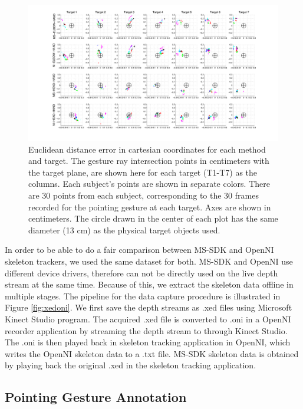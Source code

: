 \documentclass[12pt]{gatech-thesis}
\begin{document}
\begin{figure}[ht!]
\centering
\includegraphics[width=1.0\textwidth]{pics/projections.pdf}
\caption{Euclidean distance error in cartesian coordinates for each method and target. The gesture ray intersection points in centimeters with the target plane, are shown here for each target (T1-T7) as the columns.  Each subject's points are shown in separate colors.  There are 30 points from each subject, corresponding to the 30 frames recorded for the pointing gesture at each target.  Axes are shown in centimeters.  The circle drawn in the center of each plot has the same diameter (13 cm) as the physical target objects used.}
\label{fig:euclidean_projections}
\end{figure}

In order to be able to do a fair comparison between MS-SDK and OpenNI skeleton trackers, we used the same dataset for both. MS-SDK and OpenNI use different device drivers, therefore can not be directly used on the live depth stream at the same time. Because of this, we extract the skeleton data offline in multiple stages. The pipeline for the data capture procedure is illustrated in Figure \ref{fig:xedoni}. We first save the depth streams as .xed files using Microsoft Kinect Studio program. The acquired .xed file is converted to .oni in a OpenNI recorder application by streaming the depth stream to through Kinect Studio. The .oni is then played back in skeleton tracking application in OpenNI, which writes the OpenNI skeleton data to a .txt file. MS-SDK skeleton data is obtained by playing back the original .xed in the skeleton tracking application.

\subsection{Pointing Gesture Annotation}
\label{sec:pointing_gesture_annotation}
\end{document}
